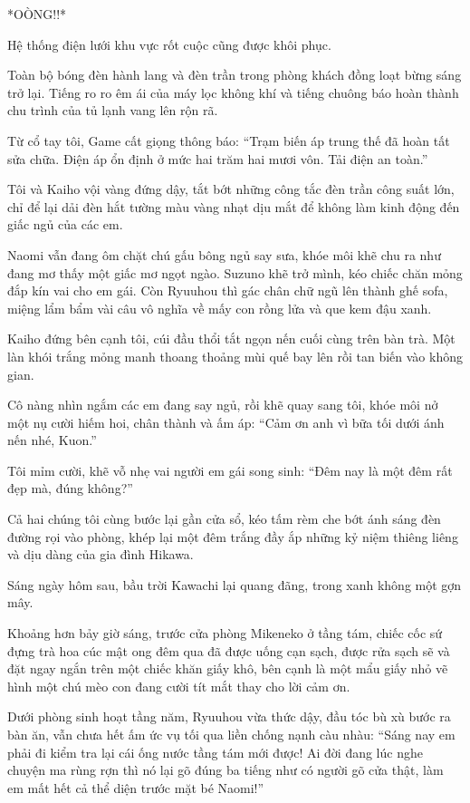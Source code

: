 \documentclass[../main.tex]{subfiles}
\begin{document}
*OÒNG!!*

Hệ thống điện lưới khu vực rốt cuộc cũng được khôi phục.

Toàn bộ bóng đèn hành lang và đèn trần trong phòng khách đồng loạt bừng sáng trở lại. Tiếng ro ro êm ái của máy lọc không khí và tiếng chuông báo hoàn thành chu trình của tủ lạnh vang lên rộn rã.

Từ cổ tay tôi, Game cất giọng thông báo: ``Trạm biến áp trung thế đã hoàn tất sửa chữa. Điện áp ổn định ở mức hai trăm hai mươi vôn. Tải điện an toàn.''

Tôi và Kaiho vội vàng đứng dậy, tắt bớt những công tắc đèn trần công suất lớn, chỉ để lại dải đèn hắt tường màu vàng nhạt dịu mắt để không làm kinh động đến giấc ngủ của các em.

Naomi vẫn đang ôm chặt chú gấu bông ngủ say sưa, khóe môi khẽ chu ra như đang mơ thấy một giấc mơ ngọt ngào. Suzuno khẽ trở mình, kéo chiếc chăn mỏng đắp kín vai cho em gái. Còn Ryuuhou thì gác chân chữ ngũ lên thành ghế sofa, miệng lẩm bẩm vài câu vô nghĩa về mấy con rồng lửa và que kem đậu xanh.

Kaiho đứng bên cạnh tôi, cúi đầu thổi tắt ngọn nến cuối cùng trên bàn trà. Một làn khói trắng mỏng manh thoang thoảng mùi quế bay lên rồi tan biến vào không gian.

Cô nàng nhìn ngắm các em đang say ngủ, rồi khẽ quay sang tôi, khóe môi nở một nụ cười hiếm hoi, chân thành và ấm áp: ``Cảm ơn anh vì bữa tối dưới ánh nến nhé, Kuon.''

Tôi mỉm cười, khẽ vỗ nhẹ vai người em gái song sinh: ``Đêm nay là một đêm rất đẹp mà, đúng không?''

Cả hai chúng tôi cùng bước lại gần cửa sổ, kéo tấm rèm che bớt ánh sáng đèn đường rọi vào phòng, khép lại một đêm trắng đầy ắp những kỷ niệm thiêng liêng và dịu dàng của gia đình Hikawa.

\omk

Sáng ngày hôm sau, bầu trời Kawachi lại quang đãng, trong xanh không một gợn mây.

Khoảng hơn bảy giờ sáng, trước cửa phòng Mikeneko ở tầng tám, chiếc cốc sứ đựng trà hoa cúc mật ong đêm qua đã được uống cạn sạch, được rửa sạch sẽ và đặt ngay ngắn trên một chiếc khăn giấy khô, bên cạnh là một mẩu giấy nhỏ vẽ hình một chú mèo con đang cười tít mắt thay cho lời cảm ơn.

Dưới phòng sinh hoạt tầng năm, Ryuuhou vừa thức dậy, đầu tóc bù xù bước ra bàn ăn, vẫn chưa hết ấm ức vụ tối qua liền chống nạnh càu nhàu: ``Sáng nay em phải đi kiểm tra lại cái ống nước tầng tám mới được! Ai đời đang lúc nghe chuyện ma rùng rợn thì nó lại gõ đúng ba tiếng như có người gõ cửa thật, làm em mất hết cả thể diện trước mặt bé Naomi!''
\end{document}
